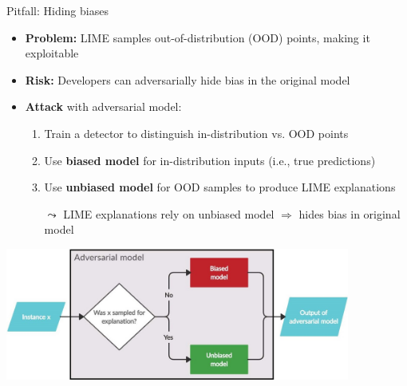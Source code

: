 \documentclass[10pt,compress,t,notes=noshow, xcolor=table]{beamer}
\begin{document}
\begin{frame}{Pitfall: Hiding biases }

\begin{itemize}
      \item \textbf{Problem:} LIME samples out-of-distribution (OOD) points, making it exploitable
  \item \textbf{Risk:} Developers can adversarially hide bias in the original model
	\pause
	\item \textbf{Attack} with adversarial model:
	    \begin{enumerate}
	    \item Train a detector to distinguish in-distribution vs. OOD points
        \item Use \textbf{biased model} for in-distribution inputs (i.e., true predictions)
        \item Use \textbf{unbiased model} for OOD samples to produce LIME explanations
        \item[$\leadsto$] LIME explanations rely on unbiased model $\Rightarrow$ hides bias in original model 
	    \end{enumerate}
\end{itemize}
	    \centering
	    \includegraphics[width=0.85\textwidth]{figure/attack_biased_unbiased.jpg}\\

\end{frame}
\end{document}
